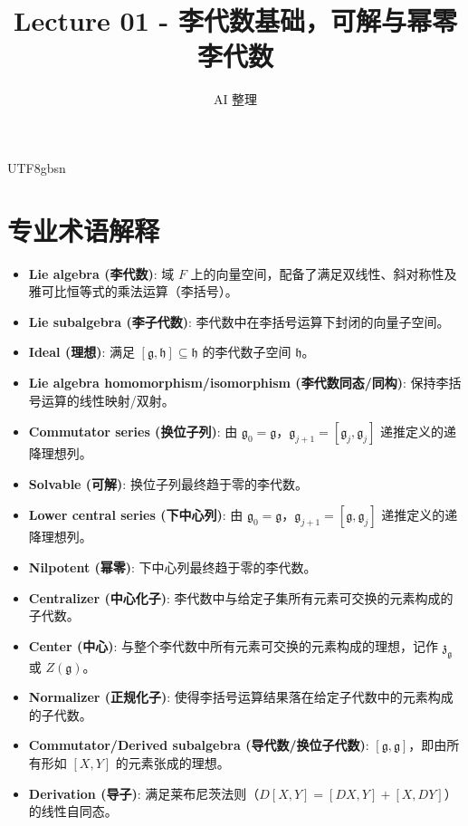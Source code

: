\documentclass[11pt]{article}
\begin{document}
\begin{CJK*}{UTF8}{gbsn}

\title{Lecture 01 - 李代数基础，可解与幂零李代数}
\author{AI 整理}
\date{}
\maketitle

\section*{专业术语解释}
\begin{itemize}
    \item \textbf{Lie algebra (李代数)}: 域 $F$ 上的向量空间，配备了满足双线性、斜对称性及雅可比恒等式的乘法运算（李括号）。
    \item \textbf{Lie subalgebra (李子代数)}: 李代数中在李括号运算下封闭的向量子空间。
    \item \textbf{Ideal (理想)}: 满足 $[\mathfrak{g}, \mathfrak{h}] \subseteq \mathfrak{h}$ 的李代数子空间 $\mathfrak{h}$。
    \item \textbf{Lie algebra homomorphism/isomorphism (李代数同态/同构)}: 保持李括号运算的线性映射/双射。
    \item \textbf{Commutator series (换位子列)}: 由 $\mathfrak{g}_0 = \mathfrak{g}$，$\mathfrak{g}_{j+1} = [\mathfrak{g}_j, \mathfrak{g}_j]$ 递推定义的递降理想列。
    \item \textbf{Solvable (可解)}: 换位子列最终趋于零的李代数。
    \item \textbf{Lower central series (下中心列)}: 由 $\mathfrak{g}_0 = \mathfrak{g}$，$\mathfrak{g}_{j+1} = [\mathfrak{g}, \mathfrak{g}_j]$ 递推定义的递降理想列。
    \item \textbf{Nilpotent (幂零)}: 下中心列最终趋于零的李代数。
    \item \textbf{Centralizer (中心化子)}: 李代数中与给定子集所有元素可交换的元素构成的子代数。
    \item \textbf{Center (中心)}: 与整个李代数中所有元素可交换的元素构成的理想，记作 $\mathfrak{z}_{\mathfrak{g}}$ 或 $Z(\mathfrak{g})$。
    \item \textbf{Normalizer (正规化子)}: 使得李括号运算结果落在给定子代数中的元素构成的子代数。
    \item \textbf{Commutator/Derived subalgebra (导代数/换位子代数)}: $[\mathfrak{g}, \mathfrak{g}]$，即由所有形如 $[X, Y]$ 的元素张成的理想。
    \item \textbf{Derivation (导子)}: 满足莱布尼茨法则（$D[X,Y] = [DX,Y] + [X,DY]$）的线性自同态。

\end{itemize}
\end{CJK*}
\end{document}
